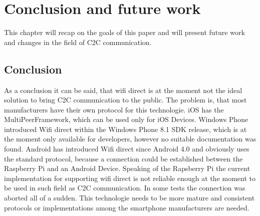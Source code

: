 \chapter{Conclusion and future work}
\label{cha:ConclusionFutureWork}
This chapter will recap on the goals of this paper and will present future work and changes in the field of C2C communication.

\section{Conclusion}
\label{sec:Conclusion}
As a conclusion it can be said, that wifi direct is at the moment not the ideal solution to bring C2C communication to the public. The problem is, that most manufacturers have their own protocol for this technologie. iOS has the MultiPeerFramework, which can be used only for iOS Devices. Windows Phone introduced Wifi direct within the Windows Phone 8.1 SDK release, which is at the moment only available for developers, however no suitable documentation was found. Android has introduced Wifi direct since Android 4.0 and obviously uses the standard protocol, because a connection could be established between the Raspberry Pi and an Android Device. Speaking of the Rapsberry Pi the current implementation for supporting wifi direct is not reliable enough at the moment to be used in such field as C2C communication. In some tests the connection was aborted all of a sudden. This technologie needs to be more mature and consistent protocols or implementations among the smartphone manufacturers are needed.

